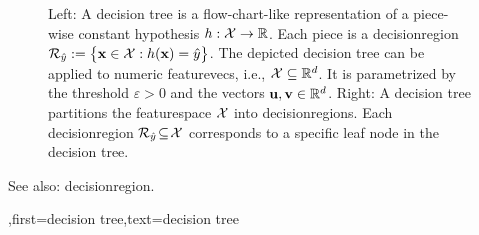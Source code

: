 {{\begin{figure}[H]
\begin{minipage}{.45\textwidth}
\end{minipage}
	\caption{Left: A decision tree is a flow-chart-like representation of a piece-wise 
	    constant \gls{hypothesis} $h: \mathcal{X} \rightarrow \mathbb{R}$.  Each piece is a \gls{decisionregion} $\mathcal{R}_{\hat{y}} := \big\{ {\bf x} \in  \mathcal{X}: h({\bf x}) = \hat{y} \big\}$. 
		The depicted decision tree can be applied to numeric \glspl{featurevec}, i.e., $\mathcal{X} \subseteq \mathbb{R}^{d}$. It is  parametrized by the threshold $\varepsilon>0$ and the vectors ${\bf u}, {\bf v} \in \mathbb{R}^{d}$. 
		Right: A decision tree partitions  
		the \gls{featurespace} $\mathcal{X}$ into \glspl{decisionregion}. Each \gls{decisionregion}  
		$\mathcal{R}_{\hat{y}} \!\subseteq\!\mathcal{X}$ corresponds to a specific leaf node in the decision tree.}
	\label{fig_decision_tree_dict}
\end{figure} 
		See also: \gls{decisionregion}.
	  }
	  ,first={decision tree},text={decision tree} }


